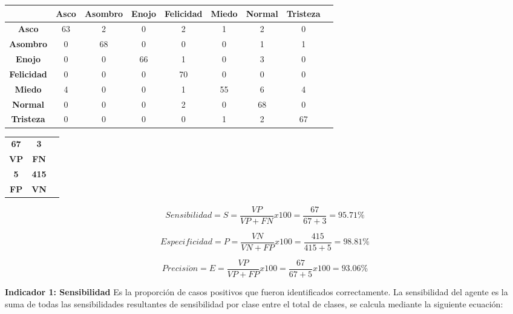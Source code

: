 \begin{table}[ht!]
\centering
\begin{tabular}{|c|c|c|c|c|c|c|c|c|} \hline
 & \bf Asco & \bf Asombro & \bf Enojo & \bf Felicidad & \bf Miedo & \bf Normal & \bf Tristeza \\ \hline
\bf Asco & 63 & 2 & 0 & 2 & 1 & 2 & 0 \\ \hline
\bf Asombro & 0 & 68 & 0 & 0 & 0 & 1 & 1 \\ \hline
\bf Enojo & 0 & 0 & 66 & 1 & 0 & 3 & 0 \\ \hline
\bf Felicidad & 0 & 0 & 0 & 70 & 0 & 0 & 0 \\ \hline
\bf Miedo & 4 & 0 & 0 & 1 & 55 & 6 & 4 \\ \hline
\bf Normal & 0 & 0 & 0 & 2 & 0 & 68 & 0 \\ \hline
\bf Tristeza & 0 & 0 & 0 & 0 & 1 & 2 & 67 \\ \hline

\end{tabular}
\end{table}

\begin{table}[ht!]
\centering
\begin{tabular}{|c|c|c|} \hline
\bf 67 \par & \bf 3 \par \\
\bf VP & \bf FN \\ \hline
\bf 5 \par & \bf 415 \par \\ 
\bf FP & \bf VN \\ \hline 
\end{tabular}
\end{table}

\begin{equation}
Sensibilidad=S=\frac{VP}{VP+FN}x100=\frac{67}{67+3}=95.71\%
\end{equation}

\begin{equation}
Especificidad=P=\frac{VN}{VN+FP}x100=\frac{415}{415+5}=98.81\%
\end{equation}

\begin{equation}
Precisi\acute{o}n=E=\frac{VP}{VP+FP}x100=\frac{67}{67+5}x100=93.06\%
\end{equation}

\vskip 5cm

{\bf Indicador 1: Sensibilidad} \vskip 0.1cm
Es la proporción de casos positivos que fueron identificados correctamente. La sensibilidad del agente es la suma de todas las sensibilidades resultantes de sensibilidad por clase entre el total de clases, se calcula mediante la siguiente ecuación:

